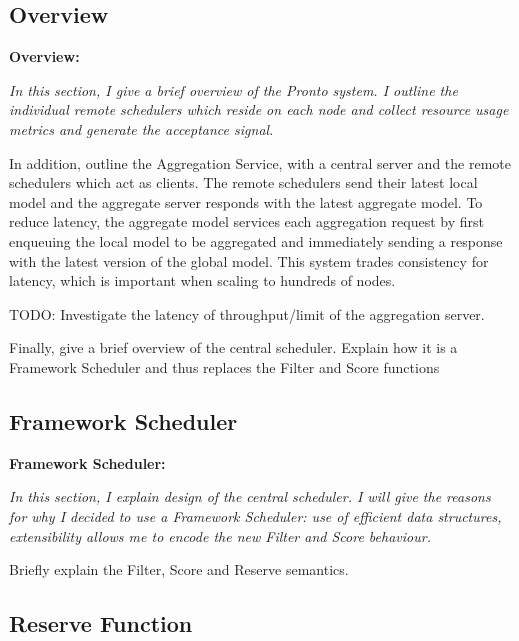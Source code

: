 \subsection{Overview}
\begin{tcolorbox}[boxsep=0mm,left=2.5mm,right=2.5mm]
    \textbf{Overview:} {\em In this section, I give a brief overview of the
    Pronto system. I outline the individual remote schedulers which reside on
    each node and collect resource usage metrics and generate the acceptance
    signal.

    In addition, outline the Aggregation Service, with a central server and the
    remote schedulers which act as clients. The remote schedulers send their
    latest local model and the aggregate server responds with the latest
    aggregate model. To reduce latency, the aggregate model services each
    aggregation request by first enqueuing the local model to be aggregated and
    immediately sending a response with the latest version of the global model.
    This system trades consistency for latency, which is important when scaling
    to hundreds of nodes.

    TODO: Investigate the latency of throughput/limit of the aggregation server.

    Finally, give a brief overview of the central scheduler. Explain how it is a
    Framework Scheduler and thus replaces the Filter and Score functions}
\end{tcolorbox}

\subsection{Framework Scheduler}
\begin{tcolorbox}[boxsep=0mm,left=2.5mm,right=2.5mm]
    \textbf{Framework Scheduler:} {\em In this section, I explain design of the central
    scheduler. I will give the reasons for why I decided to use a Framework
    Scheduler: use of efficient data structures, extensibility allows me to
    encode the new Filter and Score behaviour.

    Briefly explain the Filter, Score and Reserve semantics.
    }
\end{tcolorbox}
\subsection{Reserve Function}
